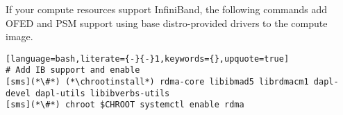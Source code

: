 If your compute resources support InfiniBand, the following commands add OFED
and PSM support using base distro-provided drivers to the compute
image.

\begin{lstlisting}[language=bash,literate={-}{-}1,keywords={},upquote=true]
# Add IB support and enable
[sms](*\#*) (*\chrootinstall*) rdma-core libibmad5 librdmacm1 dapl-devel dapl-utils libibverbs-utils
[sms](*\#*) chroot $CHROOT systemctl enable rdma
\end{lstlisting}

